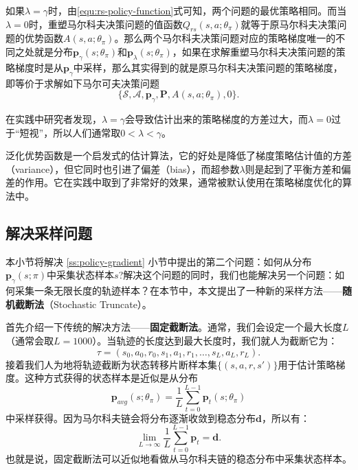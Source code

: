 如果$\lambda = \gamma$时，由\eqref{equ:rs-policy-function}式可知，两个问题的最优策略相同。而当$\lambda = 0$时，重塑马尔科夫决策问题的值函数$Q_{rs}(s, a; \theta_\pi)$就等于原马尔科夫决策问题的优势函数$A(s, a; \theta_\pi)$。那么两个马尔科夫决策问题对应的策略梯度唯一的不同之处就是分布$\mathbf{p}_{\gamma}(s;\theta_\pi)$和$\mathbf{p}_{\lambda}(s; \theta_\pi)$，如果在求解重塑马尔科夫决策问题的策略梯度时是从$\mathbf{p}_{\gamma}$中采样，那么其实得到的就是原马尔科夫决策问题的策略梯度，即等价于求解如下马尔可夫决策问题
\begin{equation}
    \{\mathcal{S}, \mathcal{A}, \mathbf{p}_\gamma, \mathbf{P}, A(s, a;\theta_\pi), 0\}.
\end{equation}

在实践中研究者发现，$\lambda = \gamma$会导致估计出来的策略梯度的方差过大，而$\lambda=0$过于``短视''，所以人们通常取$0 < \lambda < \gamma$。

\begin{remark}
泛化优势函数是一个启发式的估计算法，它的好处是降低了梯度策略估计值的方差（variance），但它同时也引进了偏差（bias），而超参数$\lambda$则是起到了平衡方差和偏差的作用。它在实践中取到了非常好的效果，通常被默认使用在策略梯度优化的算法中。
\end{remark}

\subsection{解决采样问题}

本小节将解决 \ref{ss:policy-gradient} 小节中提出的第二个问题：如何从分布$\mathbf{p}_{\gamma}(s; \pi)$中采集状态样本$s$?解决这个问题的同时，我们也能解决另一个问题：如何采集一条无限长度的轨迹样本？在本节中，本文提出了一种新的采样方法——\textbf{随机截断法}（Stochastic Truncate）。

首先介绍一下传统的解决方法——\textbf{固定截断法}。通常，我们会设定一个最大长度$L$（通常会取$L = 1000$）。当轨迹的长度达到最大长度时，我们就人为截断它为：
\begin{equation}
    \tau = (s_0, a_0, r_0, s_1, a_1, r_1, \ldots, s_L, a_L, r_L).
\end{equation}
接着我们人为地将轨迹截断为状态转移片断样本集$\{(s, a, r, s')\}$用于估计策略梯度。这种方式获得的状态样本是近似是从分布
\begin{equation}
    \mathbf{p}_{avg}(s;\theta_\pi) = \frac{1}{L} \sum^{L-1}_{t=0} \mathbf{p}_t(s;\theta_\pi)  
\end{equation}
中采样获得。因为马尔科夫链会将分布逐渐收敛到稳态分布$\mathbf{d}$，所以有：
\begin{equation}
    \lim_{L \rightarrow \infty} \frac{1}{L} \sum^{L-1}_{t=0} \mathbf{p}_t = \mathbf{d}.
\end{equation}
也就是说，固定截断法可以近似地看做从马尔科夫链的稳态分布中采集状态样本。

